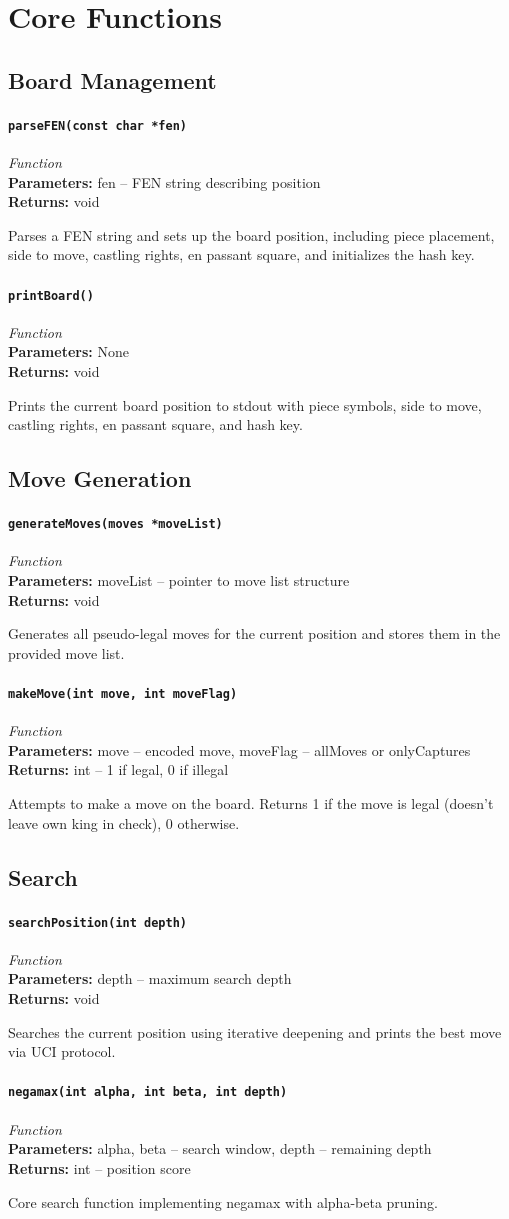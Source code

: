 \documentclass[11pt,a4paper]{report}
\newcommand{\function}[4]{%
    \paragraph{\texttt{#1}} \hfill \textit{#2}\\
    \textbf{Parameters:} #3\\
    \textbf{Returns:} #4
}
\begin{document}
\section{Core Functions}

\subsection{Board Management}

\function{parseFEN(const char *fen)}{Function}{fen -- FEN string describing position}{void}

Parses a FEN string and sets up the board position, including piece placement, side to move, castling rights, en passant square, and initializes the hash key.

\function{printBoard()}{Function}{None}{void}

Prints the current board position to stdout with piece symbols, side to move, castling rights, en passant square, and hash key.

\subsection{Move Generation}

\function{generateMoves(moves *moveList)}{Function}{moveList -- pointer to move list structure}{void}

Generates all pseudo-legal moves for the current position and stores them in the provided move list.

\function{makeMove(int move, int moveFlag)}{Function}{move -- encoded move, moveFlag -- allMoves or onlyCaptures}{int -- 1 if legal, 0 if illegal}

Attempts to make a move on the board. Returns 1 if the move is legal (doesn't leave own king in check), 0 otherwise.

\subsection{Search}

\function{searchPosition(int depth)}{Function}{depth -- maximum search depth}{void}

Searches the current position using iterative deepening and prints the best move via UCI protocol.

\function{negamax(int alpha, int beta, int depth)}{Function}{alpha, beta -- search window, depth -- remaining depth}{int -- position score}

Core search function implementing negamax with alpha-beta pruning.
\end{document}
